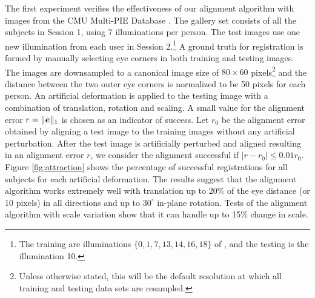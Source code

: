   The first experiment verifies the
    effectiveness of our alignment algorithm with images
    from the CMU Multi-PIE Database \cite{gross2010multi}.
    The gallery set consists of all the subjects in Session 1, using 7
    illuminations per person. The test images use
    one new illumination from each user in Session
    2.\footnote{The training are illuminations $\{0, 1, 7,
    13, 14, 16, 18\}$ of \cite{gross2010multi}, and the
    testing is the illumination 10. } A ground truth for
	registration is formed by manually selecting
    eye corners in both training and testing images. 
	The images are downsampled to a canonical image size of 
    $80\times 60$ pixels\footnote{Unless otherwise stated,
    this will be the default resolution at which 
    all training and testing data sets are resampled.} 
	and the distance between the two outer
    eye corners is normalized to be 50 pixels for each
    person. An artificial deformation is applied to the
    testing image with a combination of translation,
    rotation and scaling. A small value for the alignment
    error $r = \|\boldsymbol{e}\|_1$ is chosen as an indicator of success. Let $r_0$
    be the alignment error obtained by aligning a test
    image to the training images without any artificial
    perturbation. After the test image is artificially
    perturbed and aligned resulting in an alignment error
    $r$, we consider the alignment successful if $|r - r_0 | \leq
    0.01r_0$. Figure \ref{fig:attraction} shows the
    percentage of successful registrations for all subjects
    for each artificial deformation. The results suggest
    that the alignment algorithm works extremely well with
    translation up to 20\% of the eye distance (or 10
    pixels) in all directions and up to $30^\circ$ in-plane
    rotation. Tests of the alignment algorithm
    with scale variation show that it can handle up to 15\%
    change in scale.

